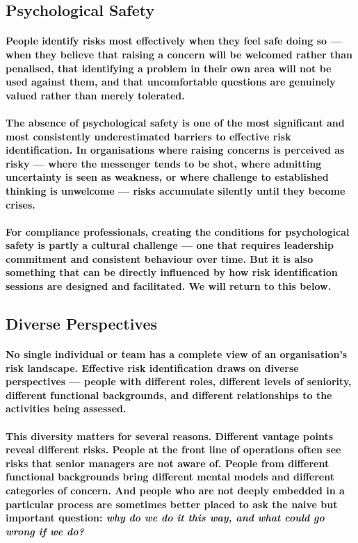 \subsection{Psychological Safety}
\paragraph{People identify risks most effectively when they feel safe doing so — when they believe that raising a concern will be welcomed rather than penalised, that identifying a problem in their own area will not be used against them, and that uncomfortable questions are genuinely valued rather than merely tolerated.}
\paragraph{The absence of psychological safety is one of the most significant and most consistently underestimated barriers to effective risk identification. In organisations where raising concerns is perceived as risky — where the messenger tends to be shot, where admitting uncertainty is seen as weakness, or where challenge to established thinking is unwelcome — risks accumulate silently until they become crises.}
\paragraph{For compliance professionals, creating the conditions for psychological safety is partly a cultural challenge — one that requires leadership commitment and consistent behaviour over time. But it is also something that can be directly influenced by how risk identification sessions are designed and facilitated. We will return to this below.}

\subsection{Diverse Perspectives}
\paragraph{No single individual or team has a complete view of an organisation's risk landscape. Effective risk identification draws on diverse perspectives — people with different roles, different levels of seniority, different functional backgrounds, and different relationships to the activities being assessed.}
\paragraph{This diversity matters for several reasons. Different vantage points reveal different risks. People at the front line of operations often see risks that senior managers are not aware of. People from different functional backgrounds bring different mental models and different categories of concern. And people who are not deeply embedded in a particular process are sometimes better placed to ask the naive but important question: \textit{why do we do it this way, and what could go wrong if we do?}}

